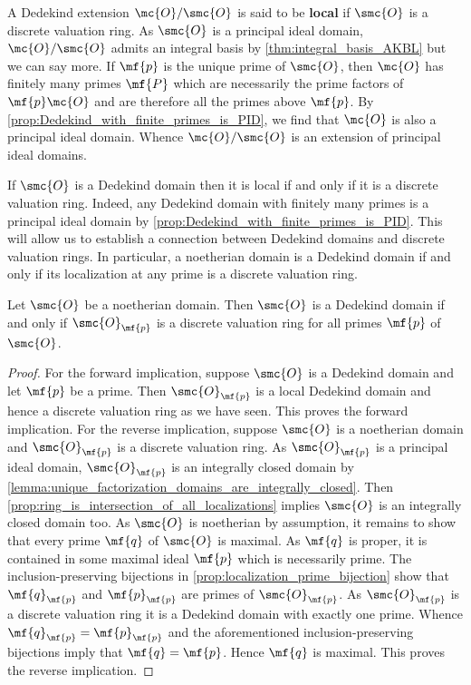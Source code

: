 \documentclass[12pt]{article}
\begin{document}
      A Dedekind extension \(\mc{O}/\smc{O}\) is said to be \textbf{local} if \(\smc{O}\) is a discrete valuation ring. As \(\smc{O}\) is a principal ideal domain, \(\mc{O}/\smc{O}\) admits an integral basis by \cref{thm:integral_basis_AKBL} but we can say more. If \(\mf{p}\) is the unique prime of \(\smc{O}\), then \(\mc{O}\) has finitely many primes \(\mf{P}\) which are necessarily the prime factors of \(\mf{p}\mc{O}\) and are therefore all the primes above \(\mf{p}\). By \cref{prop:Dedekind_with_finite_primes_is_PID}, we find that \(\mc{O}\) is also a principal ideal domain. Whence \(\mc{O}/\smc{O}\) is an extension of principal ideal domains. 
      
      If \(\smc{O}\) is a Dedekind domain then it is local if and only if it is a discrete valuation ring. Indeed, any Dedekind domain with finitely many primes is a principal ideal domain by \cref{prop:Dedekind_with_finite_primes_is_PID}. This will allow us to establish a connection between Dedekind domains and discrete valuation rings. In particular, a noetherian domain is a Dedekind domain if and only if its localization at any prime is a discrete valuation ring.

      \begin{theorem}\label{thm:Dedekind_if_and_only_if_all_localizations_are_discrete_valuation_rings}
        Let \(\smc{O}\) be a noetherian domain. Then \(\smc{O}\) is a Dedekind domain if and only if \(\smc{O}_{\mf{p}}\) is a discrete valuation ring for all primes \(\mf{p}\) of \(\smc{O}\).
      \end{theorem}
      \begin{proof}
        For the forward implication, suppose \(\smc{O}\) is a Dedekind domain and let \(\mf{p}\) be a prime. Then \(\smc{O}_{\mf{p}}\) is a local Dedekind domain and hence a discrete valuation ring as we have seen. This proves the forward implication. For the reverse implication, suppose \(\smc{O}\) is a noetherian domain and \(\smc{O}_{\mf{p}}\) is a discrete valuation ring. As \(\smc{O}_{\mf{p}}\) is a principal ideal domain, \(\smc{O}_{\mf{p}}\) is an integrally closed domain by \cref{lemma:unique_factorization_domains_are_integrally_closed}. Then \cref{prop:ring_is_intersection_of_all_localizations} implies \(\smc{O}\) is an integrally closed domain too. As \(\smc{O}\) is noetherian by assumption, it remains to show that every prime \(\mf{q}\) of \(\smc{O}\) is maximal. As \(\mf{q}\) is proper, it is contained in some maximal ideal \(\mf{p}\) which is necessarily prime. The inclusion-preserving bijections in \cref{prop:localization_prime_bijection} show that \(\mf{q}_{\mf{p}}\) and \(\mf{p}_{\mf{p}}\) are primes of \(\smc{O}_{\mf{p}}\). As \(\smc{O}_{\mf{p}}\) is a discrete valuation ring it is a Dedekind domain with exactly one prime. Whence \(\mf{q}_{\mf{p}} = \mf{p}_{\mf{p}}\) and the aforementioned inclusion-preserving bijections imply that \(\mf{q} = \mf{p}\). Hence \(\mf{q}\) is maximal. This proves the reverse implication.
      \end{proof}
\end{document}
